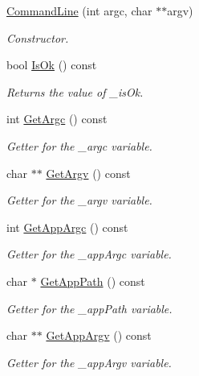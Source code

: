 \begin{DoxyCompactItemize}
\item 
\hypertarget{class_command_line_a60e98cded6040cc7ba4ad64361809ddd}{\hyperlink{class_command_line_a60e98cded6040cc7ba4ad64361809ddd}{Command\-Line} (int argc, char $\ast$$\ast$argv)}\label{class_command_line_a60e98cded6040cc7ba4ad64361809ddd}

\begin{DoxyCompactList}\small\item\em Constructor. \end{DoxyCompactList}\item 
bool \hyperlink{class_command_line_a6651a1fa1136fef801c262e9801ea419}{Is\-Ok} () const 
\begin{DoxyCompactList}\small\item\em Returns the value of \-\_\-is\-Ok. \end{DoxyCompactList}\item 
int \hyperlink{class_command_line_a5f3c2a10763e81dc91dfa2b8affbb1c7}{Get\-Argc} () const 
\begin{DoxyCompactList}\small\item\em Getter for the \-\_\-argc variable. \end{DoxyCompactList}\item 
char $\ast$$\ast$ \hyperlink{class_command_line_a5e82914e4fc19968843cbaec712f627c}{Get\-Argv} () const 
\begin{DoxyCompactList}\small\item\em Getter for the \-\_\-argv variable. \end{DoxyCompactList}\item 
int \hyperlink{class_command_line_ac420a15eac8608dd0eacf36e8e09e913}{Get\-App\-Argc} () const 
\begin{DoxyCompactList}\small\item\em Getter for the \-\_\-app\-Argc variable. \end{DoxyCompactList}\item 
char $\ast$ \hyperlink{class_command_line_ade0b4faec1c6c947cbe3cd1d8da563ef}{Get\-App\-Path} () const 
\begin{DoxyCompactList}\small\item\em Getter for the \-\_\-app\-Path variable. \end{DoxyCompactList}\item 
char $\ast$$\ast$ \hyperlink{class_command_line_ad0632810d7d2b73f7f362f419d2c58fa}{Get\-App\-Argv} () const 
\begin{DoxyCompactList}\small\item\em Getter for the \-\_\-app\-Argv variable. \end{DoxyCompactList}\item 

\end{DoxyCompactItemize}

